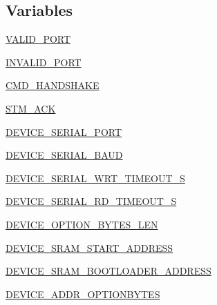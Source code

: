 \subsection*{Variables}
\begin{DoxyCompactItemize}
\item 
\hyperlink{namespacestm__tools_1_1tests_1_1serialflasher__test_a76121998433d06c203d1657532f76250}{V\+A\+L\+I\+D\+\_\+\+P\+O\+RT}
\item 
\hyperlink{namespacestm__tools_1_1tests_1_1serialflasher__test_a1ebc242e7a86c50a6b683dc73d435fc0}{I\+N\+V\+A\+L\+I\+D\+\_\+\+P\+O\+RT}
\item 
\hyperlink{namespacestm__tools_1_1tests_1_1serialflasher__test_ad9f9c99c9f1d74f4a5d2ca206cacb192}{C\+M\+D\+\_\+\+H\+A\+N\+D\+S\+H\+A\+KE}
\item 
\hyperlink{namespacestm__tools_1_1tests_1_1serialflasher__test_afa84d84f05c3b4e9a82eed55bc91c729}{S\+T\+M\+\_\+\+A\+CK}
\item 
\hyperlink{namespacestm__tools_1_1tests_1_1serialflasher__test_a69ac6aa3b441f56a130f18e70d89529f}{D\+E\+V\+I\+C\+E\+\_\+\+S\+E\+R\+I\+A\+L\+\_\+\+P\+O\+RT}
\item 
\hyperlink{namespacestm__tools_1_1tests_1_1serialflasher__test_a18e6583da27755e0b79086411e0932a6}{D\+E\+V\+I\+C\+E\+\_\+\+S\+E\+R\+I\+A\+L\+\_\+\+B\+A\+UD}
\item 
\hyperlink{namespacestm__tools_1_1tests_1_1serialflasher__test_a59d8d0899dec790143b7694e3ba7869e}{D\+E\+V\+I\+C\+E\+\_\+\+S\+E\+R\+I\+A\+L\+\_\+\+W\+R\+T\+\_\+\+T\+I\+M\+E\+O\+U\+T\+\_\+S}
\item 
\hyperlink{namespacestm__tools_1_1tests_1_1serialflasher__test_a18b0d067d54847c27a1b1f67a69fd4af}{D\+E\+V\+I\+C\+E\+\_\+\+S\+E\+R\+I\+A\+L\+\_\+\+R\+D\+\_\+\+T\+I\+M\+E\+O\+U\+T\+\_\+S}
\item 
\hyperlink{namespacestm__tools_1_1tests_1_1serialflasher__test_af2963bac2a379526db940520efa35be7}{D\+E\+V\+I\+C\+E\+\_\+\+O\+P\+T\+I\+O\+N\+\_\+\+B\+Y\+T\+E\+S\+\_\+\+L\+EN}
\item 
\hyperlink{namespacestm__tools_1_1tests_1_1serialflasher__test_a57b992b4bb523a8c3196c0a250f5ed87}{D\+E\+V\+I\+C\+E\+\_\+\+S\+R\+A\+M\+\_\+\+S\+T\+A\+R\+T\+\_\+\+A\+D\+D\+R\+E\+SS}
\item 
\hyperlink{namespacestm__tools_1_1tests_1_1serialflasher__test_a4209a37586d60a3226b7bfc01faf8efa}{D\+E\+V\+I\+C\+E\+\_\+\+S\+R\+A\+M\+\_\+\+B\+O\+O\+T\+L\+O\+A\+D\+E\+R\+\_\+\+A\+D\+D\+R\+E\+SS}
\item 
\hyperlink{namespacestm__tools_1_1tests_1_1serialflasher__test_ae150c554225b93e1684f5845ea17e055}{D\+E\+V\+I\+C\+E\+\_\+\+A\+D\+D\+R\+\_\+\+O\+P\+T\+I\+O\+N\+B\+Y\+T\+ES}

\end{DoxyCompactItemize}

